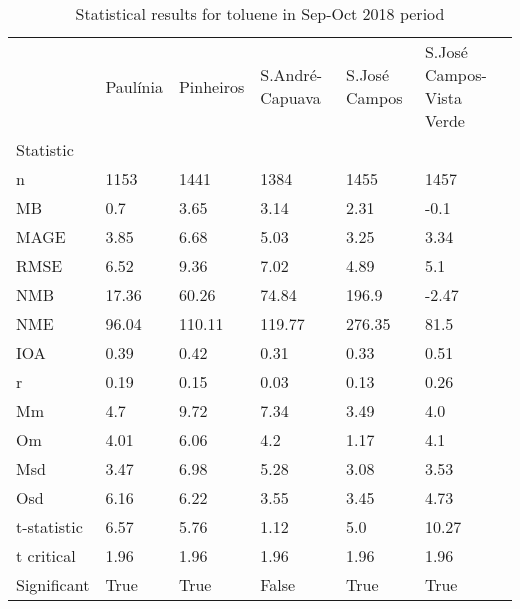 \begin{table}
\centering
\caption{Statistical results for toluene in Sep-Oct 2018 period}
\label{tab:stats_tol}
\begin{tabular}{llllll}
\toprule
{} & Paulínia & Pinheiros & S.André-Capuava & S.José Campos & S.José Campos-Vista Verde \\
Statistic   &          &           &                 &               &                           \\
\midrule
n           &     1153 &      1441 &            1384 &          1455 &                      1457 \\
MB          &      0.7 &      3.65 &            3.14 &          2.31 &                      -0.1 \\
MAGE        &     3.85 &      6.68 &            5.03 &          3.25 &                      3.34 \\
RMSE        &     6.52 &      9.36 &            7.02 &          4.89 &                       5.1 \\
NMB         &    17.36 &     60.26 &           74.84 &         196.9 &                     -2.47 \\
NME         &    96.04 &    110.11 &          119.77 &        276.35 &                      81.5 \\
IOA         &     0.39 &      0.42 &            0.31 &          0.33 &                      0.51 \\
r           &     0.19 &      0.15 &            0.03 &          0.13 &                      0.26 \\
Mm          &      4.7 &      9.72 &            7.34 &          3.49 &                       4.0 \\
Om          &     4.01 &      6.06 &             4.2 &          1.17 &                       4.1 \\
Msd         &     3.47 &      6.98 &            5.28 &          3.08 &                      3.53 \\
Osd         &     6.16 &      6.22 &            3.55 &          3.45 &                      4.73 \\
t-statistic &     6.57 &      5.76 &            1.12 &           5.0 &                     10.27 \\
t critical  &     1.96 &      1.96 &            1.96 &          1.96 &                      1.96 \\
Significant &     True &      True &           False &          True &                      True \\
\bottomrule
\end{tabular}
\end{table}

